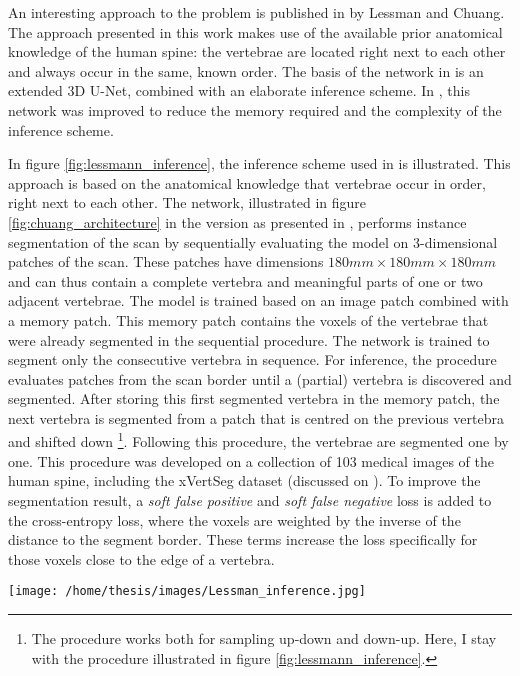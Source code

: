 \par{
    An interesting approach to the problem is published in \cite{Lessmann2018, Chuang2019} by Lessman and Chuang. 
    The approach presented in this work makes use of the available prior anatomical knowledge of the human spine: 
    the vertebrae are located right next to each other and always occur in the same, known order.  
    The basis of the network in \cite{Lessmann2018} is an extended 3D U-Net, combined with an elaborate inference scheme.
    In \cite{Chuang2019}, this network was improved to reduce the memory required and the complexity of the inference scheme.
}
\par{
    In figure \ref{fig:lessmann_inference}, the inference scheme used in \cite{Lessmann2018} is illustrated.
    This approach is based on the anatomical knowledge that vertebrae occur in order, right next to each other.
    The network, illustrated in figure \ref{fig:chuang_architecture} in the version as presented in \cite{Chuang2019}, 
    performs instance segmentation of the scan by sequentially evaluating the model on 3-dimensional patches of the scan. 
    These patches have dimensions $180mm \times 180mm \times 180mm$ and can thus contain a complete vertebra and meaningful parts of one or two adjacent vertebrae.
    The model is trained based on an image patch combined with a memory patch. This memory patch contains the voxels of the vertebrae that were already segmented in the sequential procedure.
    The network is trained to segment only the consecutive vertebra in sequence.
    For inference, the procedure evaluates patches from the scan border until a (partial) vertebra is discovered and segmented.
    After storing this first segmented vertebra in the memory patch, the next vertebra is segmented from a patch that is centred on the previous vertebra and shifted down
    \footnote{The procedure works both for sampling up-down and down-up. Here, I stay with the procedure illustrated in figure \ref{fig:lessmann_inference}.}.
    Following this procedure, the vertebrae are segmented one by one.
    This procedure was developed on a collection of 103 medical images of the human spine, including the xVertSeg dataset (discussed on \pageref{sec:xVertSeg}). 
    To improve the segmentation result, a \textit{soft false positive} and \textit{soft false negative} loss is added to the cross-entropy loss, where the voxels are weighted by the inverse of the distance to the segment border. 
    These terms increase the loss specifically for those voxels close to the edge of a vertebra.
}
\begin{SCfigure}[][htb]
    \texttt{[image: /home/thesis/images/Lessman\_inference.jpg]}
    \caption{Illustration of the inference scheme used in \cite{Lessmann2018} (image taken from same). }
    \label{fig:lessmann_inference}
\end{SCfigure}
